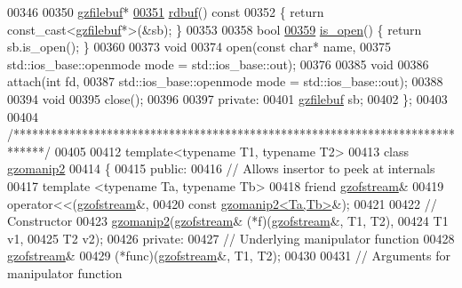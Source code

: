 \begin{DoxyCode}
00346 
00350   \hyperlink{classgzfilebuf}{gzfilebuf}*
\hyperlink{classgzofstream_a2fef74202b114357f41cfeb28f1d2acc}{00351}   \hyperlink{classgzofstream_a2fef74202b114357f41cfeb28f1d2acc}{rdbuf}()\textcolor{keyword}{ const}
00352 \textcolor{keyword}{  }\{ \textcolor{keywordflow}{return} \textcolor{keyword}{const\_cast<}\hyperlink{classgzfilebuf}{gzfilebuf}*\textcolor{keyword}{>}(&sb); \}
00353 
00358   \textcolor{keywordtype}{bool}
\hyperlink{classgzofstream_acb1c9c6dccaf41bc5e44c2263ea48de3}{00359}   \hyperlink{classgzofstream_acb1c9c6dccaf41bc5e44c2263ea48de3}{is\_open}() \{ \textcolor{keywordflow}{return} sb.is\_open(); \}
00360 
00373   \textcolor{keywordtype}{void}
00374   open(\textcolor{keyword}{const} \textcolor{keywordtype}{char}* name,
00375        std::ios\_base::openmode mode = std::ios\_base::out);
00376 
00385   \textcolor{keywordtype}{void}
00386   attach(\textcolor{keywordtype}{int} fd,
00387          std::ios\_base::openmode mode = std::ios\_base::out);
00388 
00394   \textcolor{keywordtype}{void}
00395   close();
00396 
00397 \textcolor{keyword}{private}:
00401   \hyperlink{classgzfilebuf}{gzfilebuf} sb;
00402 \};
00403 
00404 \textcolor{comment}{/*****************************************************************************/}
00405 
00412 \textcolor{keyword}{template}<\textcolor{keyword}{typename} T1, \textcolor{keyword}{typename} T2>
00413   \textcolor{keyword}{class }\hyperlink{classgzomanip2}{gzomanip2}
00414   \{
00415   \textcolor{keyword}{public}:
00416     \textcolor{comment}{// Allows insertor to peek at internals}
00417     \textcolor{keyword}{template} <\textcolor{keyword}{typename} Ta, \textcolor{keyword}{typename} Tb>
00418       \textcolor{keyword}{friend} \hyperlink{classgzofstream}{gzofstream}&
00419       operator<<(\hyperlink{classgzofstream}{gzofstream}&,
00420                  \textcolor{keyword}{const} \hyperlink{classgzomanip2}{gzomanip2<Ta,Tb>}&);
00421 
00422     \textcolor{comment}{// Constructor}
00423     \hyperlink{classgzomanip2}{gzomanip2}(\hyperlink{classgzofstream}{gzofstream}& (*f)(\hyperlink{classgzofstream}{gzofstream}&, T1, T2),
00424               T1 v1,
00425               T2 v2);
00426   \textcolor{keyword}{private}:
00427     \textcolor{comment}{// Underlying manipulator function}
00428     \hyperlink{classgzofstream}{gzofstream}&
00429     (*func)(\hyperlink{classgzofstream}{gzofstream}&, T1, T2);
00430 
00431     \textcolor{comment}{// Arguments for manipulator function}

\end{DoxyCode}
